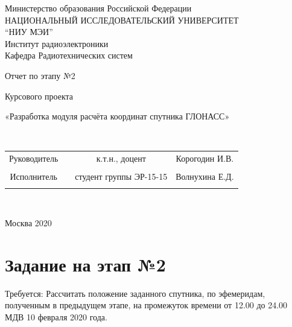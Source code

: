 \documentclass[]{article}
\begin{document}
\begin{center}
	\hfill \break
	\large{Министерство образования Российской Федерации}\\
	\large{НАЦИОНАЛЬНЫЙ ИССЛЕДОВАТЕЛЬСКИЙ УНИВЕРСИТЕТ}\\ 
	\large{“НИУ МЭИ”}\\

	\hfill \break
	\normalsize{Институт радиоэлектроники}\\
	\hfill \break
	\normalsize{Кафедра Радиотехнических систем}\\
	\hfill\break
	\hfill \break
	\hfill \break
	\hfill \break
	\large{Отчет по этапу №2
		
		Курсового проекта
		 
		«Разработка модуля расчёта координат спутника ГЛОНАСС»	}\\
	\hfill \break
	\hfill \break
	\hfill \break
	
		\hfill \break
	
		\hfill \break
	
	\hfill \break
	\hfill \break
\end{center}

\hfill \break
\hfill \break

\normalsize{ 
	\begin{tabular}{cccc}
		
	
		Руководитель & \underline{\hspace{3cm}}& к.т.н., доцент & Корогодин И.В. \\\\
		
		Исполнитель & \underline{\hspace{3cm}} &студент группы ЭР-15-15 &Волнухина Е.Д. \\\\
	\end{tabular}
}\\
\hfill \break
\hfill \break
\begin{center} Москва 2020 \end{center}
\thispagestyle{empty} %

\tableofcontents


\newpage
\section{Задание на этап №2}
Требуется:
Рассчитать положение заданного спутника, по эфемеридам, полученным в предыдущем этапе, на промежуток времени от 12.00 до 24.00 МДВ 10 февраля 2020 года. 
\end{document}
